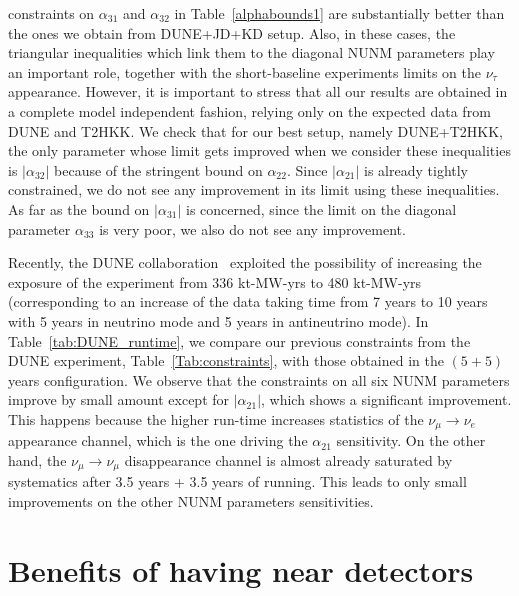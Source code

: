 \documentclass[11pt,a4paper]{article}
\newcommand{\ame}{\ensuremath{\alpha_{21}}}
\newcommand{\ate}{\ensuremath{\alpha_{31}}}
\newcommand{\atm}{\ensuremath{\alpha_{32}}}
\begin{document}
constraints on $\ate$ and $\atm$ in Table~\ref{alphabounds1} are substantially better than the ones we obtain from DUNE+JD+KD setup. Also, in these cases, the triangular inequalities which link them to the diagonal NUNM parameters  play an important role, together with the short-baseline experiments limits on the $\nu_\tau$ appearance. However, it is important to stress that all our results are obtained in a complete model independent fashion, relying only on the expected data from DUNE and T2HKK. We check that for our best setup, namely DUNE+T2HKK, the only parameter whose limit gets improved when we consider these inequalities is $|\alpha_{32}|$ because of the stringent bound on $\alpha_{22}$. Since $|\alpha_{21}|$ is already tightly constrained, we do not see any improvement in its limit using these inequalities. As far as the bound on $|\alpha_{31}|$ is concerned, since the limit  on the diagonal parameter $\alpha_{33}$ is very poor, we also do not see any improvement.

Recently, the DUNE collaboration~\cite{DUNE:2021cuw}  exploited the possibility of increasing the exposure of the experiment from 336 kt-MW-yrs to 480 kt-MW-yrs (corresponding to an increase of the  data taking time  from 7 years to 10 years with 5 years in neutrino mode and 5 years in antineutrino mode). In Table~\ref{tab:DUNE_runtime}, we compare our previous constraints from the DUNE experiment, Table~\ref{Tab:constraints}, with those obtained in the $(5 + 5)$ years configuration. We observe that the constraints on  all six NUNM parameters improve by small amount except for $|\ame|$, which shows a significant improvement. This happens because the higher run-time increases statistics of the $\nu_{\mu}\rightarrow\nu_e$ appearance channel, which is the one driving the $\alpha_{21}$ sensitivity. On the other hand, the $\nu_\mu\rightarrow\nu_{\mu}$ disappearance channel is almost already saturated by systematics after 3.5 years + 3.5 years of running. This leads to only small improvements on the other NUNM parameters sensitivities.


\section{Benefits of having near detectors}
\label{sec:ND}
\end{document}
